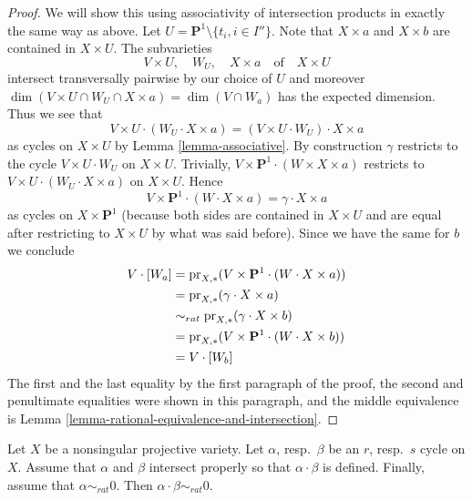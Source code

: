 \begin{proof}
\medskip\noindent
We will show this using associativity of intersection products in exactly
the same way as above. Let $U = \mathbf{P}^1 \setminus \{t_i, i \in I''\}$.
Note that $X \times a$ and $X \times b$ are contained in $X \times U$.
The subvarieties
$$
V \times U,\quad W_U,\quad X \times a\quad\text{of}\quad X \times U
$$
intersect transversally pairwise by our choice of $U$ and moreover
$\dim(V \times U \cap W_U \cap X \times a) = \dim(V \cap W_a)$ has
the expected dimension. Thus we see that
$$
V \times U \cdot (W_U \cdot X \times a) =
(V \times U \cdot W_U) \cdot X \times a
$$
as cycles on $X \times U$ by Lemma \ref{lemma-associative}.
By construction $\gamma$ restricts to the cycle $V \times U \cdot W_U$
on $X \times U$. Trivially,
$V \times \mathbf{P}^1 \cdot (W \times X \times a)$ restricts
to $V \times U \cdot (W_U \cdot X \times a)$ on $X \times U$.
Hence
$$
V \times \mathbf{P}^1 \cdot (W \cdot X \times a) =
\gamma \cdot X \times a
$$
as cycles on $X \times \mathbf{P}^1$ (because both sides
are contained in $X \times U$ and are equal after restricting
to $X \times U$ by what was said before). Since we have the same for $b$
we conclude
\begin{align*}
V \cdot [W_a]
& =
\text{pr}_{X,*}(V \times {\bf P}^1 \cdot (W \cdot X\times a)) \\
& =
\text{pr}_{X, *}(\gamma \cdot X \times a) \\
& \sim_{rat} 
\text{pr}_{X, *}(\gamma \cdot X \times b) \\
& =
\text{pr}_{X,*}(V \times {\bf P}^1 \cdot (W \cdot X\times b)) \\
& =
V \cdot [W_b]
\end{align*}
The first and the last equality by the first paragraph of the proof,
the second and penultimate equalities were shown in this paragraph, and
the middle equivalence is
Lemma \ref{lemma-rational-equivalence-and-intersection}.
\end{proof}

\begin{theorem}
\label{theorem-well-defined}
Let $X$ be a nonsingular projective variety. Let $\alpha$, resp.\ $\beta$
be an $r$, resp.\ $s$ cycle on $X$. Assume that $\alpha$ and $\beta$
intersect properly so that $\alpha \cdot \beta$ is defined. Finally,
assume that $\alpha \sim_{rat} 0$. Then $\alpha \cdot \beta \sim_{rat} 0$.
\end{theorem}

